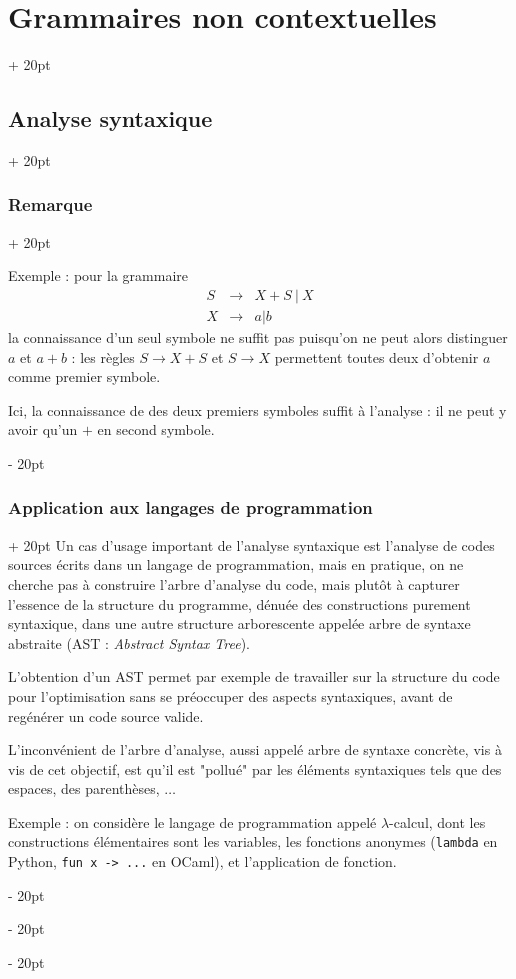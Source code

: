 \documentclass[a4paper, 12pt, twoside]{article}
\newcommand{\ind}[1][20pt]{\advance\leftskip + #1}
\newcommand{\deind}[1][20pt]{\advance\leftskip - #1}
\newenvironment{indt}[2][20pt]{#2 \par \ind[#1]}{\par \deind} %
\begin{document}
\begin{indt}{\section{Grammaires non contextuelles}}
\begin{indt}{\subsection{Analyse syntaxique}}
\begin{indt}{\subsubsection{Remarque}}
                \vspace{6pt}
                
                Exemple : pour la grammaire
                \[
                    \begin{array}{rcl}
                        S & \rightarrow & X + S \ |\ X
                        \\
                        X & \rightarrow & a | b
                    \end{array}
                \]
                la connaissance d'un seul symbole ne suffit pas puisqu'on ne peut alors distinguer $a$ et $a + b$ : les règles $S \rightarrow X + S$ et $S \rightarrow X$ permettent toutes deux d'obtenir $a$ comme premier symbole.

                Ici, la connaissance de des deux premiers symboles suffit à l'analyse : il ne peut y avoir qu'un $+$ en second symbole.
            \end{indt}

            \vspace{12pt}
            
            \begin{indt}{\subsubsection{Application aux langages de programmation}}
                Un cas d'usage important de l'analyse syntaxique est l'analyse de codes sources écrits dans un langage de programmation, mais en pratique, on ne cherche pas à construire l'arbre  d'analyse du code, mais plutôt à capturer l'essence de la structure du programme, dénuée des constructions purement syntaxique, dans une autre structure arborescente appelée arbre de syntaxe abstraite (AST : \textit{Abstract Syntax Tree}).

                L'obtention d'un AST permet par exemple de travailler sur la structure du code pour l'optimisation sans se préoccuper des aspects syntaxiques, avant de regénérer un code source valide.

                L'inconvénient de l'arbre d'analyse, aussi appelé arbre de syntaxe concrète, vis à vis de cet objectif, est qu'il est "pollué" par les éléments syntaxiques tels que des espaces, des parenthèses, $\ldots$

                \vspace{12pt}
                
                Exemple : on considère le langage de programmation appelé $\lambda$-calcul, dont les constructions élémentaires sont les variables, les fonctions anonymes (\texttt{lambda} en Python, \texttt{fun x -> ...} en OCaml), et l'application de fonction.


\end{indt}
\end{indt}
\end{indt}
\end{document}
